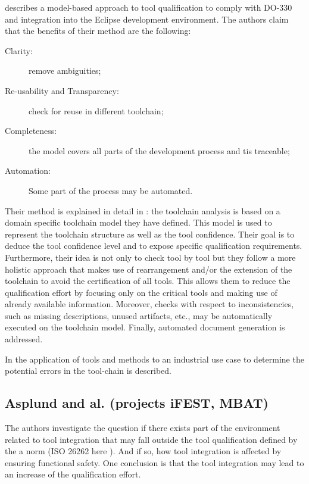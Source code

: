  \cite{slotosch_model-based_2012} describes a model-based approach to tool
 qualification to comply with DO-330 and integration into the Eclipse
 development environment. The authors claim that the benefits of their
 method  are the following:

\begin{description}
\item[Clarity:] remove ambiguities;
\item[Re-usability and Transparency:] check for reuse in different toolchain;
\item[Completeness:] the model covers all parts of the  development
  process and tis traceable;
\item[Automation:] Some part of the process may be automated.
\end{description}

Their method is explained in detail in \cite{slotosch_iso_2012}: the
toolchain analysis is based on a domain specific toolchain model
they have defined. This model is used to represent the toolchain
structure as well as the tool confidence.  Their goal is to deduce the
tool confidence level and to expose specific qualification
requirements. Furthermore, their idea is not only to check tool by
tool but they follow a more holistic approach that makes use of
rearrangement and/or the extension of the toolchain to avoid the
certification of all tools. This allows them to reduce the
qualification effort by focusing only on the critical tools and making
use of already available information.  Moreover, checks with respect to inconsistencies,
such as missing descriptions, unused artifacts, etc., may be
automatically executed on the toolchain model. Finally, automated document generation is addressed.

In \cite{wildmoser_determining_2012} the application of tools and methods to an
industrial use case to determine the potential errors in the tool-chain is described.

\subsection{Asplund and al. (projects iFEST, MBAT)}
\label{sec:asplund-approach}

The authors investigate the question if there exists part of the environment related to tool
integration that may fall outside the tool qualification defined by the a norm
(ISO 26262 here \cite{asplund_qualifying_2012}). And if so, how tool integration
is affected by ensuring functional safety. One conclusion is that the tool
integration may lead to an increase of the qualification effort.

